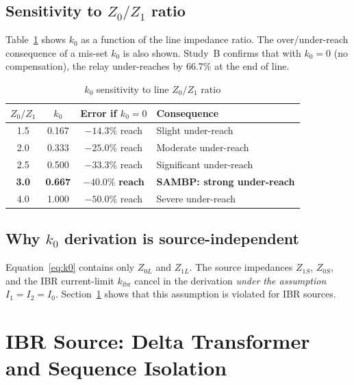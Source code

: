 \documentclass[11pt,a4paper]{article}
\begin{document}
\subsection{Sensitivity to \texorpdfstring{$Z_0/Z_1$}{Z0/Z1} ratio}

Table~\ref{tab:k0_sensitivity} shows $k_0$ as a function of the line impedance
ratio.  The over/under-reach consequence of a mis-set $k_0$ is also shown.
Study~B confirms that with $k_0=0$ (no compensation), the relay under-reaches by
$66.7\%$ at the end of line.

\begin{table}[h]
\centering
\caption{$k_0$ sensitivity to line $Z_0/Z_1$ ratio}
\label{tab:k0_sensitivity}
\begin{tabular}{@{}cccl@{}}
\toprule
$Z_0/Z_1$ & $k_0$ & Error if $k_0=0$ & Consequence \\
\midrule
1.5 & 0.167 & $-14.3\%$ reach & Slight under-reach \\
2.0 & 0.333 & $-25.0\%$ reach & Moderate under-reach \\
2.5 & 0.500 & $-33.3\%$ reach & Significant under-reach \\
\textbf{3.0} & \textbf{0.667} & $\mathbf{-40.0\%}$ \textbf{reach} & \textbf{SAMBP: strong under-reach}\\
4.0 & 1.000 & $-50.0\%$ reach & Severe under-reach \\
\bottomrule
\end{tabular}
\end{table}

\subsection{Why \texorpdfstring{$k_0$}{k0} derivation is source-independent}

Equation~\eqref{eq:k0} contains only $Z_{0L}$ and $Z_{1L}$.  The source
impedances $Z_{1S}$, $Z_{0S}$, and the IBR current-limit $k_\mathrm{ibr}$
cancel in the derivation \emph{under the assumption $I_1 = I_2 = I_0$}.
Section~\ref{sec:ibr_effect} shows that this assumption is violated for IBR
sources.

\section{IBR Source: Delta Transformer and Sequence Isolation}
\label{sec:ibr_effect}
\end{document}
